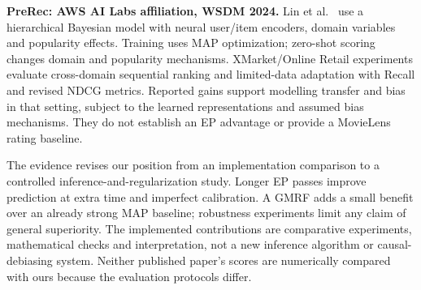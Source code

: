 \documentclass[12pt,a4paper]{article}
\begin{document}
\textbf{PreRec: AWS AI Labs affiliation, WSDM 2024.} Lin et al.~\cite{lin2024}
use a hierarchical Bayesian model with neural user/item encoders, domain
variables and popularity effects. Training uses MAP optimization;
zero-shot scoring changes domain and popularity mechanisms. XMarket/Online
Retail experiments evaluate cross-domain sequential ranking and limited-data
adaptation with Recall and revised NDCG metrics. Reported gains support modelling transfer and bias in that setting,
subject to the learned representations and assumed bias mechanisms. They do
not establish an EP advantage or provide a MovieLens rating baseline.

The evidence revises our position from an implementation comparison to a
controlled inference-and-regularization study. Longer EP passes improve
prediction at extra time and imperfect calibration. A GMRF adds a small
benefit over an already strong MAP baseline; robustness experiments limit
any claim of general superiority. The implemented contributions are comparative
experiments, mathematical checks and interpretation, not a new inference
algorithm or causal-debiasing system. Neither published paper's scores are
numerically compared with ours because the evaluation protocols differ.



\FloatBarrier


\clearpage
\appendix

\end{document}
